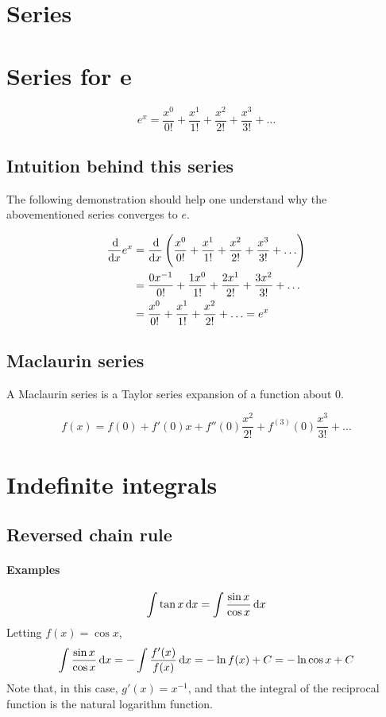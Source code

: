 \documentclass[12pt, oneside]{book}
\begin{document}
\section{Series}
\section{Series for e}
\[e^x = \frac{x^0}{0!} + \frac{x^1}{1!} + \frac{x^2}{2!} + \frac{x^3}{3!} + \ldots\]

\subsection{Intuition behind this series}
The following demonstration should help one understand why the abovementioned
series converges to \(e\).

\begin{align*}
    \frac{\dif}{\dif x} e^x
    &= \frac{\dif}{\dif x} \left( \frac{x^0}{0!} + \frac{x^1}{1!} + \frac{x^2}{2!} + \frac{x^3}{3!} + \ldots \right) \\
    &= \frac{0 x^{-1}}{0!} + \frac{1 x^0}{1!} + \frac{2 x^1}{2!} + \frac{3 x^2}{3!} + \ldots \\
    &= \frac{x^0}{0!} + \frac{x^1}{1!} + \frac{x^2}{2!} + \ldots = e^x
\end{align*}

\subsection{Maclaurin series}
A Maclaurin series is a Taylor series expansion of a function about 0.

\[f\left(x\right) = f\left(0\right) + f'\left(0\right)x + f''\left(0\right)\frac{x^2}{2!} + f^{\left( 3 \right)}\left(0\right)\frac{x^3}{3!} + \ldots\]

\section{Indefinite integrals}
\subsection{Reversed chain rule}
\paragraph{Examples}
\[\int \tan x \dif x = \int \frac{\sin{x}}{\cos{x}} \dif x\]
Letting \(f(x) = \cos x\),
\[\int \frac{\sin{x}}{\cos{x}} \dif x = - \int \frac{f'(x)}{f(x)} \dif x
= - \ln{f(x)} + C = - \ln{\cos x} + C\]
Note that, in this case, \(g'(x) = x^{-1}\), and that the integral of the
reciprocal function is the natural logarithm function.
\end{document}
